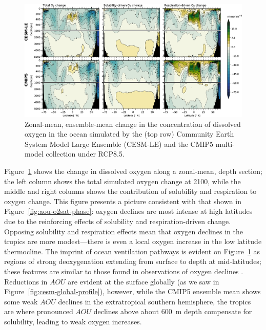 \documentclass{report_chapter}
\begin{document}
\begin{figure}[tbhp]
\centering
\includegraphics[width=1\textwidth]{global-zonal-mean-O2-AOU-O2sat.png}
\caption{Zonal-mean, ensemble-mean change in the concentration of dissolved oxygen in the ocean simulated by the (top row) Community Earth System Model Large Ensemble (CESM-LE) and the CMIP5 multi-model collection under RCP8.5.}
\label{fig:zonal-mean-section}
\end{figure}

Figure~\ref{fig:zonal-mean-section} shows the change in dissolved oxygen along a zonal-mean, depth section; the left column shows the total simulated oxygen change at 2100, while the middle and right columns shows the contribution of solubility and respiration to oxygen change.
This figure presents a picture consistent with that shown in Figure~\ref{fig:aou-o2sat-phase}: oxygen declines are most intense at high latitudes due to the reinforcing effects of solubility and respiration-driven change.
Opposing solubility and respiration effects mean that oxygen declines in the tropics are more modest---there is even a local oxygen increase in the low latitude thermocline.
The imprint of ocean ventilation pathways is evident on Figure~\ref{fig:zonal-mean-section} as regions of strong deoxygenation extending from surface to depth at mid-latitudes; these features are similar to those found in observations of oxygen declines \citep{Helm-Bindoff-etal-2011}.
Reductions in $AOU$ are evident at the surface globally (as we saw in Figure~\ref{fig:cesm-global-profile}), however, while the CMIP5 ensemble mean shows some weak $AOU$ declines in the extratropical southern hemisphere, the tropics are where pronounced $AOU$ declines above about 600~m depth compensate for solubility, leading to weak oxygen increases.
\end{document}
